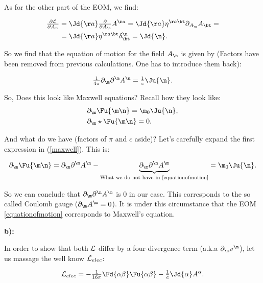 As for the other part of the EOM, we find:

\begin{equation}
	\begin{split}
		\tfrac{\partial \matL}{\partial \vad{n}} &= \Jd{\aa} \tfrac{\partial}{\partial \vad{\n}} \vau{\aa} = \Jd{\aa} \metu{\aa\bt} \pd{\vad{\n}} \vad{\bt} = \\
		&=  \Jd{\aa} \metu{\aa\bt} \deltita{\n}{\bt}  = \Jd{\n}. 
	\end{split}
\end{equation}

So we find that the equation of motion for the field $\vad{\n}$ is given by (Factors have been removed from previous calculations. One has to introduce them back):

\begin{equation}\label{equationofmotion}
	\tfrac{1}{4\pi} \pd{\m}\pu{\m}\vau{\n} = \tfrac{1}{c} \Ju{\n}.
\end{equation}

So, Does this look like Maxwell equations? Recall how they look like:
\begin{equation}\label{maxwell}
	\begin{split}
		&\pd{\m}\Fu{\m\n} = \m_{0} \Ju{\n},\\
		&\pd{\m} \star \Fu{\m\n} =0.\\
	\end{split}
\end{equation}

And what do we have (factors of $\pi$ and $c$ aside)? Let's carefully expand the first expression in (\ref{maxwell}). This is:

\begin{equation}
	\pd{\m}\Fu{\m\n} = \pd{\m}\pu{\m}\vau{\n} - \underbrace{\pd{\m}\pu{\n}\vau{\m}}_{\text{What we do not have in \ref{equationofmotion}}}= \m_{0} \Ju{\n}.
\end{equation}

So we can conclude that $\pd{\m}\pu{\n}\vau{\m}$ is 0 in our case. This corresponds to the so called Coulomb gauge ($\pd{\m}\vau{\m}=0$). It is under this circumstance that the EOM \ref{equationofmotion} corresponds to Maxwell's equation.

\textbf{b):}

In order to show that both $\mathcal{L}$ differ by a four-divergence term (a.k.a $\pd{\m} v^{\m}$), let us massage the well know $\mathcal{L}_{elec}$:

\begin{equation}
	\matL_{elec} = -\tfrac{1}{16 \pi} \Fd{\alpha\beta} \Fu{\alpha\beta} - \tfrac{1}{c} \Jd{\alpha}\vau{\alpha}.
\end{equation}

